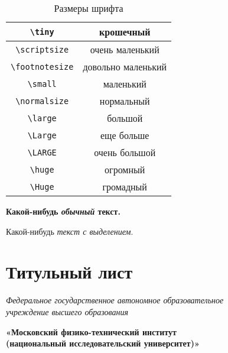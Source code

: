 \documentclass[a4paper,14pt]{extarticle}
\begin{document}
\begin{table}[H]
	\centering
	\begin{tabular}{|c|c|}
		\hline	\verb|\tiny|      & \tiny        крошечный \\
		\hline	\verb|\scriptsize|   & \scriptsize  очень маленький\\
		\hline \verb|\footnotesize| & \footnotesize  довольно маленький \\
		\hline \verb|\small|        &  \small        маленький \\
		\hline \verb|\normalsize|   &  \normalsize  нормальный \\
		\hline \verb|\large|        &  \large       большой \\
		\hline \verb|\Large|        &  \Large       еще больше \\[5pt]
		\hline \verb|\LARGE|        &  \LARGE       очень большой \\[5pt]
		\hline \verb|\huge|         &  \huge        огромный \\[5pt]
		\hline \verb|\Huge|         &  \Huge        громадный \\ \hline
	\end{tabular}
\caption{Размеры шрифта}
\end{table}

\begin{Huge}
	\textbf{Какой-нибудь \textit{обычный}  текст.}
\end{Huge}

Какой-нибудь \emph{текст \emph{с} выделением}.
\vfill
\section{Титульный лист}
\newpage

\thispagestyle{empty}
\begin{center}
	\textit{Федеральное государственное автономное образовательное\\ учреждение высшего образования }
	
	\vspace{0.5ex}
	
	\textbf{«Московский физико-технический институт\\ (национальный исследовательский университет)»}
\end{center}

\vspace{10ex}
\end{document}
